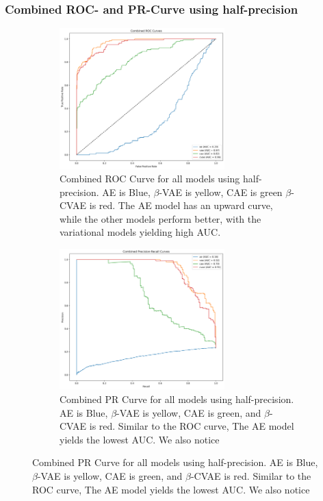 \subsubsection{Combined ROC- and PR-Curve using half-precision}
\begin{figure}[!htbp]
    \centering
    \begin{subfigure}[b]{\textwidth}
        \centering
        \includegraphics[width=0.7\textwidth]{figures/anomalies/combined_roc_curve.png}
        \caption{Combined ROC Curve for all models using half-precision. AE is Blue, $\beta$-VAE is yellow, CAE is green $\beta$-CVAE is red. The AE model has an upward curve, while the other models perform better, with the variational models yielding high AUC.}
        \label{fig:roccurve}
    \end{subfigure}
    \vspace{1em}
    \begin{subfigure}[b]{\textwidth}
        \centering
        \includegraphics[width=0.7\textwidth]{figures/anomalies/combined_pr_curve.png}
        \caption{Combined PR Curve for all models using half-precision. AE is Blue, $\beta$-VAE is yellow, CAE is green, and $\beta$-CVAE is red. Similar to the ROC curve, The AE model yields the lowest AUC. We also notice }
        \label{fig:prcurve}
    \end{subfigure}
    \label{fig:combined_curves}
\end{figure}
\clearpage

